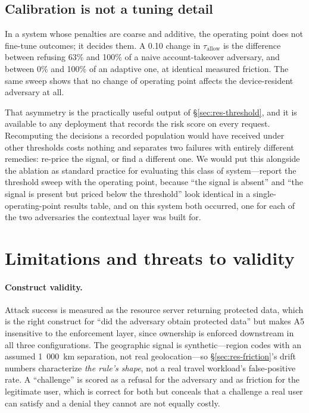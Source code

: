 \subsection{Calibration is not a tuning detail}

In a system whose penalties are coarse and additive, the operating point does not fine-tune outcomes; it decides them. A 0.10 change in $\tau_{\mathrm{allow}}$ is the difference between refusing 63\% and 100\% of a naive account-takeover adversary, and between 0\% and 100\% of an adaptive one, at identical measured friction. The same sweep shows that no change of operating point affects the device-resident adversary at all.

That asymmetry is the practically useful output of \S\ref{sec:res-threshold}, and it is available to any deployment that records the risk score on every request. Recomputing the decisions a recorded population would have received under other thresholds costs nothing and separates two failures with entirely different remedies: re-price the signal, or find a different one. We would put this alongside the ablation as standard practice for evaluating this class of system---report the threshold sweep with the operating point, because ``the signal is absent'' and ``the signal is present but priced below the threshold'' look identical in a single-operating-point results table, and on this system both occurred, one for each of the two adversaries the contextual layer was built for.

\section{Limitations and threats to validity}
\label{sec:limitations}

\paragraph{Construct validity.} Attack success is measured as the resource server returning protected data, which is the right construct for ``did the adversary obtain protected data'' but makes A5 insensitive to the enforcement layer, since ownership is enforced downstream in all three configurations. The geographic signal is synthetic---region codes with an assumed 1~000~km separation, not real geolocation---so \S\ref{sec:res-friction}'s drift numbers characterize \textit{the rule's shape}, not a real travel workload's false-positive rate. A ``challenge'' is scored as a refusal for the adversary and as friction for the legitimate user, which is correct for both but conceals that a challenge a real user can satisfy and a denial they cannot are not equally costly.

